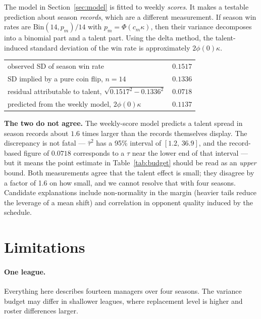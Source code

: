 \documentclass[11pt]{article}
\begin{document}
The model in Section~\ref{sec:model} is fitted to weekly \emph{scores}. It makes
a testable prediction about season \emph{records}, which are a different
measurement. If season win rates are $\text{Bin}(14, p_m)/14$ with
$p_m = \Phi(c_m \kappa)$, then their variance decomposes into a binomial part
and a talent part. Using the delta method, the talent-induced standard deviation
of the win rate is approximately $2\phi(0)\kappa$.

\begin{center}\small
\begin{tabular}{lr}
\toprule
observed SD of season win rate & $0.1517$ \\
SD implied by a pure coin flip, $n=14$ & $0.1336$ \\
residual attributable to talent, $\sqrt{0.1517^2 - 0.1336^2}$ & $0.0718$ \\
predicted from the weekly model, $2\phi(0)\kappa$ & $0.1137$ \\
\bottomrule
\end{tabular}
\end{center}

\textbf{The two do not agree.} The weekly-score model predicts a talent spread
in season records about $1.6$ times larger than the records themselves display.
The discrepancy is not fatal --- $\widehat\tau^2$ has a 95\% interval of
$[1.2,\,36.9]$, and the record-based figure of $0.0718$ corresponds to a $\tau$
near the lower end of that interval --- but it means the point estimate in
Table~\ref{tab:budget} should be read as an \emph{upper} bound. Both
measurements agree that the talent effect is small; they disagree by a factor of
1.6 on how small, and we cannot resolve that with four seasons. Candidate
explanations include non-normality in the margin (heavier tails reduce the
leverage of a mean shift) and correlation in opponent quality induced by the
schedule.

\section{Limitations}

\paragraph{One league.} Everything here describes fourteen managers over four
seasons. The variance budget may differ in shallower leagues, where replacement
level is higher and roster differences larger.
\end{document}
